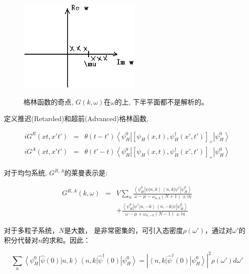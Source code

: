 \begin{figure}[h]
\begin{center}
  \includegraphics[width=6cm]{Zero/GF_poles.ps}\\
  \caption{格林函数的奇点, $G(k, \omega)$在$\omega$的上, 下半平面都不是解析的。}\label{GF poles}
\end{center}
\end{figure}


定义推迟(Retarded)和超前(Advanced)格林函数,

\begin{eqnarray*}
  iG^R (xt,x't') &=& \theta(t-t') \left\langle \psi_H^0 \right| \left[ \psi_H(x,t), \psi_H^\dagger(x',t') \right]_+ \left| \psi_H^0 \right\rangle \\
  iG^A (xt,x't') &=& \theta(t'-t) \left\langle \psi_H^0 \right| \left[ \psi_H(x,t), \psi_H^\dagger(x',t') \right]_+ \left| \psi_H^0 \right\rangle
\end{eqnarray*}


对于均匀系统, $G^{R,A}$的莱曼表示是:

\begin{eqnarray*}
  G^{R,A}(k,\omega) &=& V \sum_n  \frac{\left\langle \psi_H^0 \right|\psi \left|n,k
\right\rangle \left\langle n,k \right|\psi^\dagger \left| \psi_H^0
\right\rangle }{\omega-\mu-\omega_{n,k}(N+1) \pm i \eta}\\
  {} & & +
\frac{\left\langle \psi_H^0 \right| \psi^\dagger \left|n,-k
\right\rangle \left\langle n,-k \right|\psi \left| \psi_H^0
\right\rangle }{\omega-\mu + \omega_{n,-k}(N-1) \pm i \eta}
\end{eqnarray*}






对于多粒子系统，$N$是大数，
是非常密集的，可引入态密度$\rho(\omega')$，通过对$\omega'$的积分代替对$n$的求和。因此：



\[
\sum\limits_{n}  {\left\langle {\psi _H^0 } \right|\hat \psi
(0)\left| {n,k} \right\rangle \left\langle {n,k} \right|\hat \psi
^\dagger (0)\left| {\psi _H^0 } \right\rangle }  = \left|
{\left\langle {n,k} \right|\hat \psi ^\dagger  (0)\left| {\psi _H^0
} \right\rangle } \right|^2 \rho \left( {\omega '} \right)d\omega '
\]


